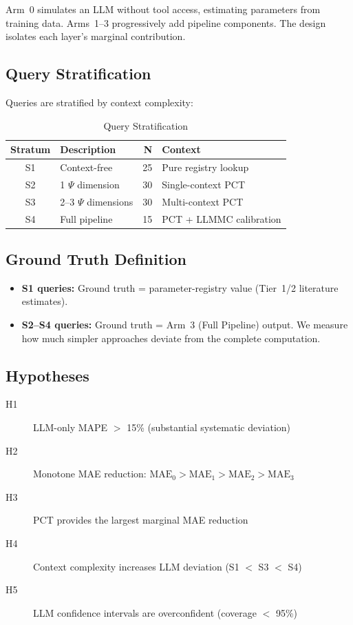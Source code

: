 Arm~0 simulates an LLM without tool access, estimating parameters from
training data. Arms~1--3 progressively add pipeline components. The design
isolates each layer's marginal contribution.

\subsection{Query Stratification}

Queries are stratified by context complexity:

\begin{table}[htbp]
\centering
\caption{Query Stratification}
\label{tab:tla-strata}
\begin{tabular}{clrl}
\toprule
\textbf{Stratum} & \textbf{Description} & \textbf{N} & \textbf{Context} \\
\midrule
S1 & Context-free     & 25 & Pure registry lookup \\
S2 & 1 $\Psi$ dimension & 30 & Single-context PCT \\
S3 & 2--3 $\Psi$ dimensions & 30 & Multi-context PCT \\
S4 & Full pipeline    & 15 & PCT + LLMMC calibration \\
\bottomrule
\end{tabular}
\end{table}

\subsection{Ground Truth Definition}

\begin{itemize}
\item \textbf{S1 queries:} Ground truth = parameter-registry value
  (Tier~1/2 literature estimates).
\item \textbf{S2--S4 queries:} Ground truth = Arm~3 (Full Pipeline) output.
  We measure how much simpler approaches deviate from the complete computation.
\end{itemize}

\subsection{Hypotheses}

\begin{description}
\item[H1] LLM-only MAPE $>$ 15\% (substantial systematic deviation)
\item[H2] Monotone MAE reduction: $\text{MAE}_0 > \text{MAE}_1 > \text{MAE}_2 > \text{MAE}_3$
\item[H3] PCT provides the largest marginal MAE reduction
\item[H4] Context complexity increases LLM deviation (S1 $<$ S3 $<$ S4)
\item[H5] LLM confidence intervals are overconfident (coverage $<$ 95\%)
\end{description}


